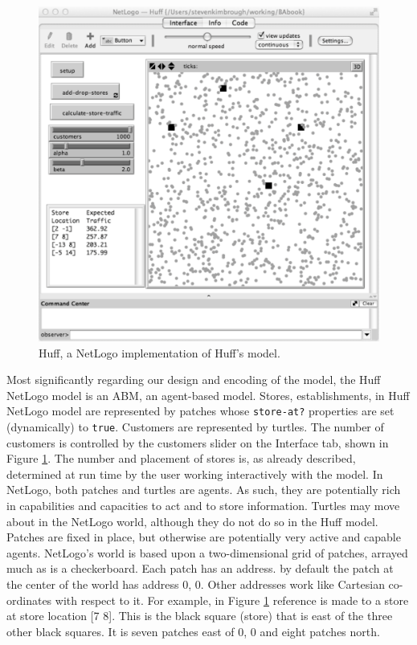 \begin{figure}[htbp] %
   \centering
   \includegraphics[width=\textwidth]{figures/HuffPatches.pdf}  
   \caption{Huff, a NetLogo implementation of Huff's model.} %
   \label{fig:huffnlogo}
\end{figure}
\newpage

Most significantly regarding our design and encoding of the model, the Huff NetLogo model is an ABM, an agent-based model.
Stores, establishments, in Huff NetLogo model are represented by patches whose {\tt store-at?} properties are set (dynamically) to {\tt true}. Customers are represented by turtles. The number of customers is controlled by the customers slider on the Interface tab, shown in Figure \ref{fig:huffnlogo}. The number and placement of stores is, as already described, determined at run time by the user working interactively with the model.  In NetLogo, both patches and turtles are agents. As such, they are potentially rich in capabilities and capacities to act and  to store information. Turtles may move about in the NetLogo world, although they do not do so in the Huff model. Patches are fixed in place, but otherwise are potentially very active and capable agents. NetLogo's world is based upon a two-dimensional grid  of patches, arrayed much as is a checkerboard. Each patch has an address. by default the patch at the center of the world has address 0, 0. Other addresses work like Cartesian co-ordinates with respect to it. For example, in Figure \ref{fig:huffnlogo} reference is made to a store at store location [7 8]. This is the black square (store) that is east of the three other black squares. It is seven patches east of 0, 0 and eight patches north.

